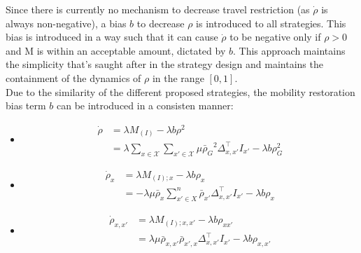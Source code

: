 Since there is currently no mechanism to decrease travel restriction (as $\dot \rho$ is always non-negative), a bias $b$ to decrease $\rho$ is introduced to all strategies. This bias is introduced in a way such that it can cause $\dot \rho$ to be negative only if $\rho>0$ and M is within an acceptable amount, dictated by $b$. This approach maintains the simplicity that's saught after in the strategy design and maintains the containment of the dynamics of $\rho$ in the range $[0,1]$.\\

Due to the similarity of the different proposed strategies, the mobility restoration bias term $b$ can be introduced in a consisten manner:
\begin{itemize}
    \item {}
         
    \begin{equation}
        \begin{aligned}
    \dot{\rho} &= \lambda M_{(I)} - \lambda b \rho^2 \\
               &= \lambda \sum_{x \in \mathcal{X}} \sum_{x' \in \mathcal{X}} \mu {\bar{\rho}_{G}}^2 \Delta^{\top}_{x,x'} I_{x'} - \lambda b \rho_G^2 \label{global bias}
        \end{aligned}
    \end{equation}

    \item {}     
    \begin{equation}
        \begin{aligned}
            \dot{\rho}_x &= \lambda M_{(I);x} - \lambda b \rho_{x} \\
            &= -\lambda \mu \bar{\rho}_x \sum_{x' \in X}^{n} \bar{\rho}_{x'} \Delta^{\top}_{x,x'} I_{x'}  - \lambda b \rho_x
        \end{aligned}
    \end{equation}

    \item {} 
    \begin{equation}
        \begin{aligned}
            \dot{\rho}_{x,x'} &= \lambda M_{(I);x,x'} - \lambda b \rho_{xx'}\\
            &= \lambda \mu \bar{\rho}_{x,x'} \bar{\rho}_{x',x} \Delta^{\top}_{x,x'} I_{x'} - \lambda b \rho_{x,x'}
        \end{aligned}
    \end{equation}

\end{itemize}

